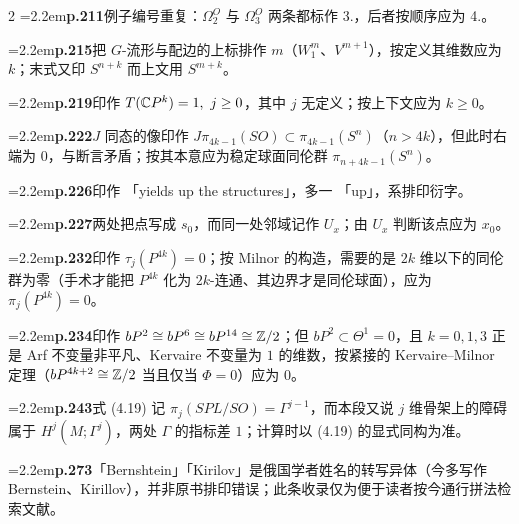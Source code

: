 \begin{multicols}{2}
\noindent\hangindent=2.2em\textbf{p.211}\quad 例子编号重复：$\Omega^O_2$ 与 $\Omega^O_3$ 两条都标作 3.，后者按顺序应为 4.。\par

\noindent\hangindent=2.2em\textbf{p.215}\quad 把 $G$-流形与配边的上标排作 $m$（$W^m_1$、$V^{m+1}$），按定义其维数应为 $k$；末式又印 $S^{n+k}$ 而上文用 $S^{m+k}$。\par

\noindent\hangindent=2.2em\textbf{p.219}\quad 印作 $T(\mathbb{C}P^k)=1,\ j\ge0$，其中 $j$ 无定义；按上下文应为 $k\ge0$。\par

\noindent\hangindent=2.2em\textbf{p.222}\quad $J$ 同态的像印作 $J\pi_{4k-1}(SO)\subset\pi_{4k-1}(S^n)$（$n>4k$），但此时右端为 $0$，与断言矛盾；按其本意应为稳定球面同伦群 $\pi_{n+4k-1}(S^n)$。\par

\noindent\hangindent=2.2em\textbf{p.226}\quad 印作 「yields up the structures」，多一 「up」，系排印衍字。\par

\noindent\hangindent=2.2em\textbf{p.227}\quad 两处把点写成 $s_0$，而同一处邻域记作 $U_x$；由 $U_x$ 判断该点应为 $x_0$。\par

\noindent\hangindent=2.2em\textbf{p.232}\quad 印作 $\tau_j(P^{4k})=0$；按 Milnor 的构造，需要的是 $2k$ 维以下的同伦群为零（手术才能把 $P^{4k}$ 化为 $2k$-连通、其边界才是同伦球面），应为 $\pi_j(P^{4k})=0$。\par

\noindent\hangindent=2.2em\textbf{p.234}\quad 印作 $bP^2\cong bP^6\cong bP^{14}\cong\mathbb{Z}/2$；但 $bP^2\subset\Theta^1=0$，且 $k=0,1,3$ 正是 Arf 不变量非平凡、Kervaire 不变量为 $1$ 的维数，按紧接的 Kervaire--Milnor 定理（$bP^{4k+2}\cong\mathbb{Z}/2$ 当且仅当 $\Phi=0$）应为 $0$。\par

\noindent\hangindent=2.2em\textbf{p.243}\quad 式 (4.19) 记 $\pi_j(SPL/SO)=\Gamma^{j-1}$，而本段又说 $j$ 维骨架上的障碍属于 $H^j(M;\Gamma^j)$，两处 $\Gamma$ 的指标差 $1$；计算时以 (4.19) 的显式同构为准。\par

\noindent\hangindent=2.2em\textbf{p.273}\quad 「Bernshtein」「Kirilov」是俄国学者姓名的转写异体（今多写作 Bernstein、Kirillov），并非原书排印错误；此条收录仅为便于读者按今通行拼法检索文献。\par


\end{multicols}
